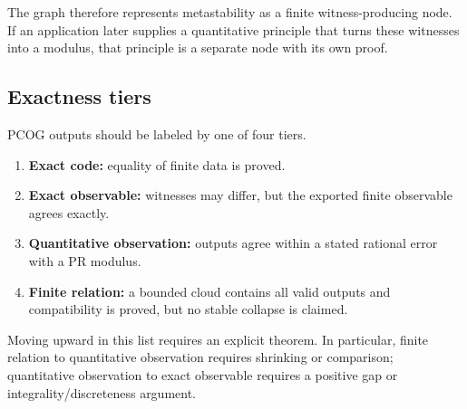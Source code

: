 The graph therefore represents metastability as a finite witness-producing
node.  If an application later supplies a quantitative principle that turns
these witnesses into a modulus, that principle is a separate node with its own
proof.

\subsection{Exactness tiers}

PCOG outputs should be labeled by one of four tiers.

\begin{enumerate}
\item \textbf{Exact code:} equality of finite data is proved.
\item \textbf{Exact observable:} witnesses may differ, but the exported finite
observable agrees exactly.
\item \textbf{Quantitative observation:} outputs agree within a stated rational
error with a PR modulus.
\item \textbf{Finite relation:} a bounded cloud contains all valid outputs and
compatibility is proved, but no stable collapse is claimed.
\end{enumerate}

Moving upward in this list requires an explicit theorem.  In particular,
finite relation to quantitative observation requires shrinking or comparison;
quantitative observation to exact observable requires a positive gap or
integrality/discreteness argument.
